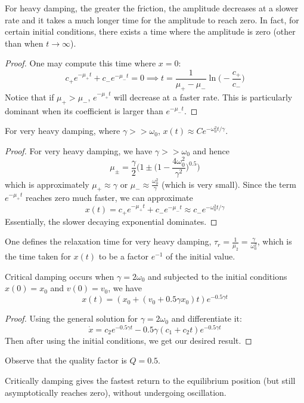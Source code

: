 \documentclass[a4paper]{article}
\begin{document}
\begin{cor}
For heavy damping, the greater the friction, the amplitude decreases at a slower rate and it takes a much longer time for the amplitude to reach zero. In fact, for certain initial conditions, there exists a time where the amplitude is zero (other than when $t\rightarrow\infty$).
\end{cor}
\begin{proof}
One may compute this time where $x=0$:
$$c_+e^{-\mu_+t}+c_-e^{-\mu_-t}=0\implies t=\frac{1}{\mu_+-\mu_-}\ln\bigg(-\frac{c_+}{c_-}\bigg)$$
Notice that if $\mu_+>\mu_-$, $e^{-\mu_+t}$ will decrease at a faster rate. This is particularly dominant when its coefficient is larger than $e^{-\mu_-t}$.
\end{proof}
\begin{thm}
For very heavy damping, where $\gamma>>\omega_0$, $x(t)\approx Ce^{-\omega_0^2t/\gamma}$.
\end{thm}
\begin{proof}
For very heavy damping, we have $\gamma>>\omega_0$ and hence
$$\mu_\pm=\frac{\gamma}{2}\bigg(1\pm\bigg(1-\frac{4\omega_0^2}{\gamma^2}\bigg)^{0.5}\bigg)$$
which is approximately $\mu_+\approx\gamma$ or $\mu_-\approx\frac{\omega_0^2}{\gamma}$ (which is very small). Since the term $e^{-\mu_+t}$ reaches zero much faster, we can approximate
$$x(t)=c_+e^{-\mu_+t}+c_-e^{-\mu_-t}\approx c_-e^{-\omega_0^2t/\gamma}$$
Essentially, the slower decaying exponential dominates.
\end{proof}
\begin{defi}
One defines the relaxation time for very heavy damping, $\tau_r=\frac{1}{\mu_2}=\frac{\gamma}{\omega_0^2}$, which is the time taken for $x(t)$ to be a factor $e^{-1}$ of the initial value.
\end{defi}
\begin{thm}
Critical damping occurs when $\gamma=2\omega_0$ and subjected to the initial conditions $x(0)=x_0$ and $v(0)=v_0$, we have
$$x(t)=(x_0+(v_0+0.5\gamma x_0)t)e^{-0.5\gamma t}$$
\end{thm}
\begin{proof}
Using the general solution for $\gamma=2\omega_0$ and differentiate it:
$$\dot{x}=c_2e^{-0.5\gamma t}-0.5\gamma(c_1+c_2t)e^{-0.5\gamma t}$$
Then after using the initial conditions, we get our desired result. 
\end{proof}
Observe that the quality factor is $Q=0.5$.
\begin{cor}
Critically damping gives the fastest return to the equilibrium position (but still asymptotically reaches zero), without undergoing oscillation.
\end{cor}
\end{document}
